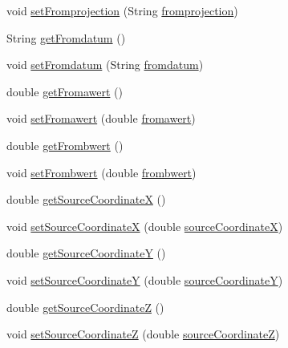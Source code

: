 \begin{DoxyCompactItemize}
\item 
void \hyperlink{classparams_1_1_control_parms_ab7f98c31662cc19a37c38630c7652d16}{set\+Fromprojection} (String \hyperlink{classparams_1_1_control_parms_af020acb1b072ddea3560e25cac18ac3f}{fromprojection})
\item 
String \hyperlink{classparams_1_1_control_parms_a351a1525bef8a4e648bc2d79f57079a7}{get\+Fromdatum} ()
\item 
void \hyperlink{classparams_1_1_control_parms_a126be81b5ff3d178bc8c5c932433a6dc}{set\+Fromdatum} (String \hyperlink{classparams_1_1_control_parms_aad346084aae4e796320eae7c950ce914}{fromdatum})
\item 
double \hyperlink{classparams_1_1_control_parms_a059d3a66ef8da8b3735b204026cbdf62}{get\+Fromawert} ()
\item 
void \hyperlink{classparams_1_1_control_parms_a7074fde2b7e5a80c50cb997d78786668}{set\+Fromawert} (double \hyperlink{classparams_1_1_control_parms_ae0a950871fef34d367d8a70e80fc0fd0}{fromawert})
\item 
double \hyperlink{classparams_1_1_control_parms_a53c75f21640c052696f9c0c249847706}{get\+Frombwert} ()
\item 
void \hyperlink{classparams_1_1_control_parms_aaf0d60a3e1b3362be227d9721537a424}{set\+Frombwert} (double \hyperlink{classparams_1_1_control_parms_ad4f4af5989abca7c5616feb442c2e7c0}{frombwert})
\item 
double \hyperlink{classparams_1_1_control_parms_a983d9ff3981b01e4fc538626a50bdd30}{get\+Source\+CoordinateX} ()
\item 
void \hyperlink{classparams_1_1_control_parms_af40634625631868be25843439ef54567}{set\+Source\+CoordinateX} (double \hyperlink{classparams_1_1_control_parms_a2688293d730d637a973567b209289996}{source\+CoordinateX})
\item 
double \hyperlink{classparams_1_1_control_parms_a0260c671857a637b51ddc23af52ad71d}{get\+Source\+CoordinateY} ()
\item 
void \hyperlink{classparams_1_1_control_parms_a54d42ffa9c74db6b5c3ee1d2544c5e21}{set\+Source\+CoordinateY} (double \hyperlink{classparams_1_1_control_parms_a3e2c396bf201d9c84f4efdf8dfef51d1}{source\+CoordinateY})
\item 
double \hyperlink{classparams_1_1_control_parms_a67542179daef32a9001cee0862832858}{get\+Source\+CoordinateZ} ()
\item 
void \hyperlink{classparams_1_1_control_parms_ae0a1b0117d381b3005fd567cb3e0c647}{set\+Source\+CoordinateZ} (double \hyperlink{classparams_1_1_control_parms_ae3c3b4ee3fb2bef870380e13e573aec2}{source\+CoordinateZ})

\end{DoxyCompactItemize}
